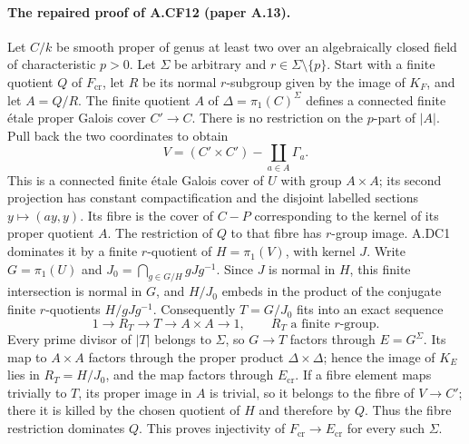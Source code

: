 \paragraph{The repaired proof of A.CF12 (paper A.13).}
Let $C/k$ be smooth proper of genus at least two over an algebraically
closed field of characteristic $p>0$. Let $\Sigma$ be arbitrary and
$r\in\Sigma\setminus\{p\}$. Start with a finite quotient $Q$ of
$F_{\mathrm{cr}}$, let $R$ be its normal $r$-subgroup given by the
image of $K_F$, and let $A=Q/R$. The finite quotient $A$ of
$\Delta=\pi_1(C)^\Sigma$ defines a connected finite \'etale proper
Galois cover $C'\to C$. There is no restriction on the $p$-part of
$|A|$. Pull back the two coordinates to obtain
\[
 V=(C'\times C')-\coprod_{a\in A}\Gamma_a.
\]
This is a connected finite \'etale Galois cover of $U$ with group
$A\times A$; its second projection has constant compactification and
the disjoint labelled sections $y\mapsto(ay,y)$. Its fibre is the
cover of $C-P$ corresponding to the kernel of its proper quotient $A$.
The restriction of $Q$ to that fibre has $r$-group image. A.DC1
dominates it by a finite $r$-quotient of $H=\pi_1(V)$, with kernel
$J$. Write $G=\pi_1(U)$ and
$J_0=\bigcap_{g\in G/H}gJg^{-1}$. Since $J$ is normal in $H$,
this finite intersection is normal in $G$, and $H/J_0$ embeds
in the product of the conjugate finite $r$-quotients $H/gJg^{-1}$.
Consequently $T=G/J_0$ fits into
an exact sequence
\[
 1\to R_T\to T\to A\times A\to1,
 \qquad R_T\text{ a finite }r\text{-group}.
\]
Every prime divisor of $|T|$ belongs to $\Sigma$, so $G\to T$
factors through $E=G^\Sigma$. Its map to $A\times A$ factors
through the proper product $\Delta\times\Delta$; hence the image
of $K_E$ lies in $R_T=H/J_0$, and the map factors through
$E_{\mathrm{cr}}$. If a fibre element maps trivially to $T$,
its proper image in $A$ is trivial, so it belongs to the fibre
of $V\to C'$; there it is killed by the chosen quotient of $H$
and therefore by $Q$. Thus the fibre restriction dominates $Q$.
This proves injectivity of
$F_{\mathrm{cr}}\to E_{\mathrm{cr}}$ for every such $\Sigma$.

